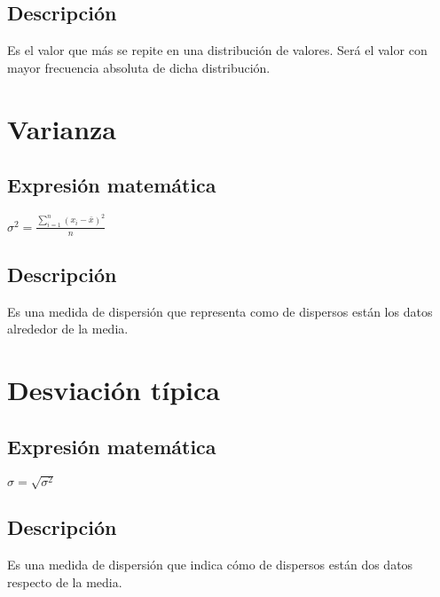 \documentclass[12pt,letterpaper]{article}
\begin{document}
\subsection{Descripción}
\noindent
Es el valor que más se repite en una distribución de valores. Será el valor con mayor frecuencia absoluta de dicha distribución.

\section{Varianza}
\subsection{Expresión matemática}
\noindent
\begin{center}
	$\sigma^{2}=\frac{\sum_{i=1}^{n}(x_{i}-\bar{x})^{2}}{n}$
\end{center}

\subsection{Descripción}
\noindent
Es una medida de dispersión que representa como de dispersos están los datos alrededor de la media.

\section{Desviación típica}
\subsection{Expresión matemática}
\noindent
\begin{center}
	$\sigma=\sqrt{\sigma^{2}}$
\end{center}

\subsection{Descripción}
\noindent
Es una medida de dispersión que indica cómo de dispersos están dos datos respecto de la media.
\end{document}
